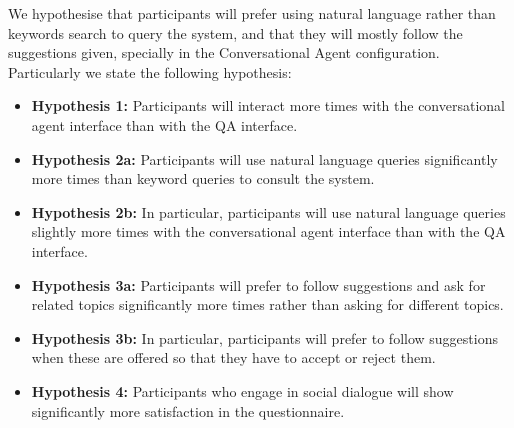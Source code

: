 We hypothesise that participants will prefer using natural language rather than keywords search to query the system, and that they will mostly follow the suggestions given, specially in the Conversational Agent configuration. Particularly we state the following hypothesis:

\begin{itemize}
  \item \textbf{Hypothesis 1:} Participants will interact more times with the conversational agent interface than with the QA interface.    
  \item \textbf{Hypothesis 2a:} Participants will use natural language queries significantly more times than keyword queries to consult the system.
  \item \textbf{Hypothesis 2b:} In particular, participants will use natural language queries slightly more times with the conversational agent interface than with the QA interface.
  \item \textbf{Hypothesis 3a:} Participants will prefer to follow suggestions and ask for related topics significantly more times rather than asking for different topics.
  \item \textbf{Hypothesis 3b:} In particular, participants will prefer to follow suggestions when these are offered so that they have to accept or reject them.
  \item \textbf{Hypothesis 4:} Participants who engage in social dialogue will show significantly more satisfaction in the questionnaire.  
\end{itemize}


